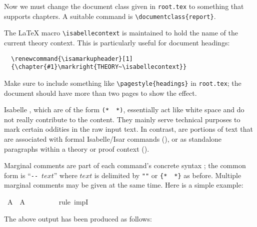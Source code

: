 \begin{isabellebody}
\begin{isamarkuptext}
  \noindent Now we must change the document class given in
  \texttt{root.tex} to something that supports chapters.  A suitable
  command is \verb,\documentclass{report},.

  \medskip The {\LaTeX} macro \verb,\isabellecontext, is maintained to
  hold the name of the current theory context.  This is particularly
  useful for document headings:

\begin{verbatim}
  \renewcommand{\isamarkupheader}[1]
  {\chapter{#1}\markright{THEORY~\isabellecontext}}
\end{verbatim}

  \noindent Make sure to include something like
  \verb,\pagestyle{headings}, in \texttt{root.tex}; the document
  should have more than two pages to show the effect.%
\end{isamarkuptext}%
\isamarkuptrue%
%
\isamarkuptrue%
%
\begin{isamarkuptext}%
Isabelle , which are of the form
  \verb,(,\verb,*,~~\verb,*,\verb,),, essentially act like
  white space and do not really contribute to the content.  They
  mainly serve technical purposes to mark certain oddities in the raw
  input text.  In contrast,  are portions of
  text that are associated with formal Isabelle/Isar commands
  (), or as standalone paragraphs within a
  theory or proof context ().

  \medskip Marginal comments are part of each command's concrete
  syntax \cite{isabelle-ref}; the common form is ``\verb,--,~$text$''
  where $text$ is delimited by \verb,",\verb,", or
  \verb,{,\verb,*,~~\verb,*,\verb,}, as before.  Multiple
  marginal comments may be given at the same time.  Here is a simple
  example:%
\end{isamarkuptext}%
\isamarkuptrue%
\isamarkupfalse%
\ {}A\ {}{}{}\ A{}\isanewline
\ \ %
\isanewline
\ \ %
\isanewline
%
\isadelimproof
\ \ %
\endisadelimproof
%
\isatagproof
{}\isamarkupfalse%
\ {}rule\ impI{}\ %
%
\endisatagproof
{\isafoldproof}%
%
\isadelimproof
%
\endisadelimproof
%
\begin{isamarkuptext}%
\noindent The above output has been produced as follows:


\end{isamarkuptext}
\end{isabellebody}
